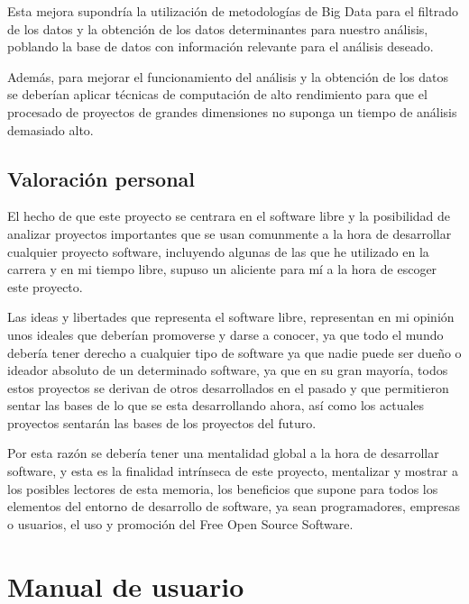 \documentclass[a4paper, spanish, 12pt]{book}
\begin{document}
Esta mejora supondr\'ia la utilizaci\'on de metodolog\'ias de Big Data para el filtrado
de los datos y la obtenci\'on de los datos determinantes para nuestro an\'alisis,
poblando la base de datos con informaci\'on relevante para el an\'alisis deseado.

Adem\'as, para mejorar el funcionamiento del an\'alisis y la obtenci\'on de los datos
se deber\'ian aplicar t\'ecnicas de computaci\'on de alto rendimiento para que
el procesado de proyectos de grandes dimensiones no suponga un tiempo de an\'alisis
demasiado alto.

\section{Valoraci\'on personal}
\label{sec:valoracion}

El hecho de que este proyecto se centrara en el software libre y la posibilidad
de analizar proyectos importantes que se usan comunmente a la hora de desarrollar cualquier
proyecto software, incluyendo algunas de las que he utilizado en la carrera y en mi tiempo
libre, supuso un aliciente para m\'i a la hora de escoger este proyecto.

Las ideas y libertades que representa el software libre, representan en mi opini\'on
unos ideales que deber\'ian promoverse y darse a conocer, ya que todo el mundo deber\'ia
tener derecho a cualquier tipo de software ya que nadie puede ser due\~no o ideador
absoluto de un determinado software, ya que en su gran mayor\'ia, todos estos proyectos
se derivan de otros desarrollados en el pasado y que permitieron sentar las bases de lo que
se esta desarrollando ahora, as\'i como los actuales proyectos sentar\'an las bases
de los proyectos del futuro.

Por esta raz\'on se deber\'ia tener una mentalidad global a la hora de desarrollar
software, y esta es la finalidad intr\'inseca de este proyecto, mentalizar y mostrar
a los posibles lectores de esta memoria, los beneficios que supone para todos los
elementos del entorno de desarrollo de software, ya sean programadores, empresas o usuarios,
el uso y promoci\'on del Free Open Source Software.


\cleardoublepage
\appendix
\chapter{Manual de usuario}
\label{app:manual}
\end{document}
